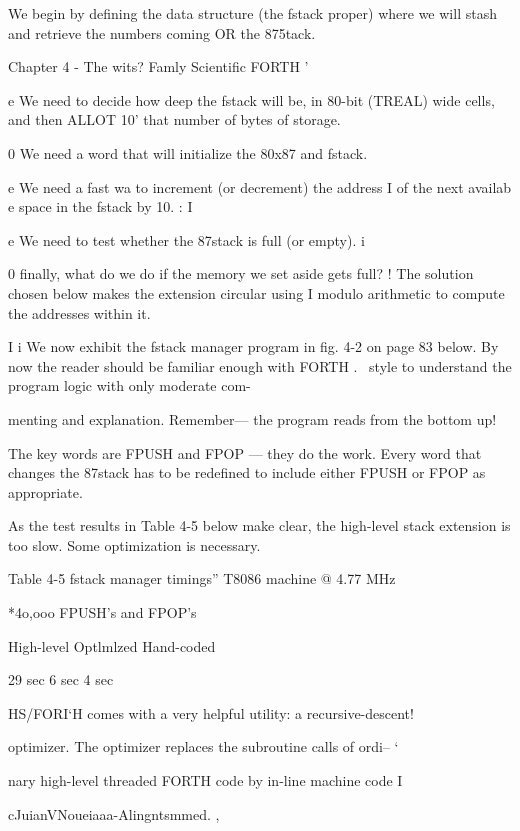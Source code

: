 {We begin by defining the data structure (the fstack proper) where
we will stash and retrieve the numbers coming OR the 875tack.

Chapter 4 - The wits? Famly Scientific FORTH '

e We need to decide how deep the fstack will be, in 80-bit
(TREAL) wide cells, and then ALLOT 10' that number of
bytes of storage.

0 We need a word that will initialize the 80x87 and fstack.

e We need a fast wa to increment (or decrement) the address I
of the next availab e space in the fstack by 10. :
I

e We need to test whether the 87stack is full (or empty). i

0 finally, what do we do if the memory we set aside gets full? !
The solution chosen below makes the extension circular using I
modulo arithmetic to compute the addresses within it.

I
i
We now exhibit the fstack manager program in fig. 4-2 on page 83
below. By now the reader should be familiar enough with FORTH .~
style to understand the program logic with only moderate com-

menting and explanation. Remember— the program reads from
the bottom up!

The key words are FPUSH and FPOP — they do the work. Every
word that changes the 87stack has to be redefined to include
either FPUSH or FPOP as appropriate.

As the test results in Table 4-5 below make clear, the high-level
stack extension is too slow. Some optimization is necessary.

Table 4-5 fstack manager timings”
T8086 machine @ 4.77 MHz

*4o,ooo FPUSH's and FPOP's

 

High-level Optlmlzed Hand-coded

29 sec 6 sec 4 sec

 

 

 

HS/FORI‘H comes with a very helpful utility: a recursive-descent!

optimizer. The optimizer replaces the subroutine calls of ordi-- ‘

nary high-level threaded FORTH code by in-line machine code I

cJuianVNoueiaaa-Alingntsmmed. ,

 

}
